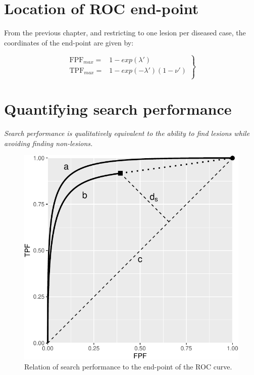 \documentclass[
]{book}
\begin{document}
\hypertarget{rsm-sc-end-point}{%
\section{Location of ROC end-point}\label{rsm-sc-end-point}}

From the previous chapter, and restricting to one lesion per diseased case, the coordinates of the end-point are given by:

\begin{equation}
\left. 
\begin{aligned}
\text{FPF}_{max} =& 1 - exp\left (\lambda' \right ) \\
\text{TPF}_{max} =& 1 - exp \left ( - \lambda' \right ) \left ( 1 - \nu' \right )\\
\end{aligned}
\right \}
\label{eq:rsm-sc-FPF-TPF-max}
\end{equation}

\hypertarget{rsm-sc-quantifying}{%
\section{Quantifying search performance}\label{rsm-sc-quantifying}}

\emph{Search performance is qualitatively equivalent to the ability to find lesions while avoiding finding non-lesions.}

\begin{figure}
\centering
\includegraphics{17b-rsm-search-classification_files/figure-latex/rsm-sc-performance-from-roc-curve-1.pdf}
\caption{\label{fig:rsm-sc-performance-from-roc-curve}Relation of search performance to the end-point of the ROC curve.}
\end{figure}
\end{document}
